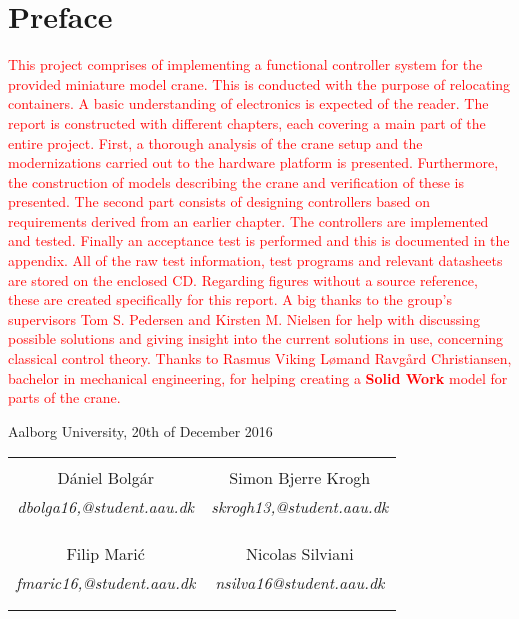 \chapter*{Preface}

\textcolor{red}{This project comprises of implementing a functional controller system for the provided miniature model crane. This is conducted with the purpose of relocating containers. A basic understanding of electronics is expected of the reader. The report is constructed with different chapters, each covering a main part of the entire project. First, a thorough analysis of the crane setup and the modernizations carried out to the hardware platform is presented. Furthermore, the construction of models describing the crane and verification of these is presented. The second part consists of designing controllers based on requirements derived from an earlier chapter. The controllers are implemented and tested. Finally an acceptance test is performed and this is documented in the appendix. All of the raw test information, test programs and relevant datasheets are stored on the enclosed CD. Regarding figures without a source reference, these are created specifically for this report. A big thanks to the group's supervisors Tom S. Pedersen and Kirsten M. Nielsen for help with discussing possible solutions and giving insight into the current solutions in use, concerning classical control theory. Thanks to Rasmus Viking Lømand Ravgård Christiansen, bachelor in mechanical engineering, for helping creating a \textbf{Solid Work} \cite{Solid_Work} model for parts of the crane. }

\begin{flushright}
Aalborg University, 20th of December 2016
\end{flushright}





\vfill

\begin{table}[H]
	\centering
		\begin{tabular}{c c }
			\underline{\phantom{mmmmmmmmmmmmmmmmmmm}}       & \underline{\phantom{mmmmmmmmmmmmmmmmmmm}} \\
			Dániel Bolgár			 & Simon Bjerre Krogh  \\
			\textit{dbolga16,@student.aau.dk} & \textit{skrogh13,@student.aau.dk}\\
			&\\
			&\\
			\underline{\phantom{mmmmmmmmmmmmmmmmmmm}}       & \underline{\phantom{mmmmmmmmmmmmmmmmmmm}} \\
		    Filip Marić			 & Nicolas Silviani\\
			\textit{fmaric16,@student.aau.dk} & \textit{nsilva16@student.aau.dk} \\
			&\\
			&\\	
		\end{tabular}
\end{table}